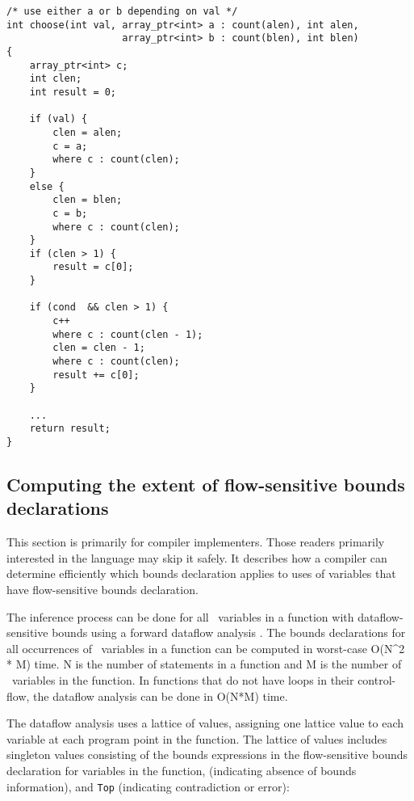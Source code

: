 \begin{verbatim}
/* use either a or b depending on val */
int choose(int val, array_ptr<int> a : count(alen), int alen,
                    array_ptr<int> b : count(blen), int blen) 
{
    array_ptr<int> c;
    int clen;
    int result = 0;

    if (val) {
        clen = alen;
        c = a;
        where c : count(clen);
    }
    else {
        clen = blen;
        c = b;
        where c : count(clen);
    }
    if (clen > 1) {
        result = c[0];
    }

    if (cond  && clen > 1) {
        c++
        where c : count(clen - 1);
        clen = clen - 1;
        where c : count(clen);
        result += c[0];
    }
    
    ...
    return result;
}
\end{verbatim}

\subsection{Computing the extent of flow-sensitive bounds declarations}

This section is primarily for compiler implementers. Those readers
primarily interested in the language may skip it safely. It describes
how a compiler can determine efficiently which bounds declaration
applies to uses of variables that have flow-sensitive bounds
declaration.

The inference process can be done for all \arrayptr\ variables
in a function with dataflow-sensitive bounds using a forward dataflow
analysis \cite{Aho2007}. The bounds declarations for all occurrences of
\arrayptr\ variables in a function can be computed in
worst-case O(N\^{}2 * M) time. N is the number of statements in a
function and M is the number of \arrayptr\ variables in the
function. In functions that do not have loops in their control-flow, the
dataflow analysis can be done in O(N*M) time.

The dataflow analysis uses a lattice of values, assigning one lattice
value to each variable at each program point in the function. The
lattice of values includes singleton values consisting of the bounds
expressions in the flow-sensitive bounds declaration for variables in
the function, \boundsnone (indicating absence of bounds
information), and \texttt{Top} (indicating contradiction or error):

 
